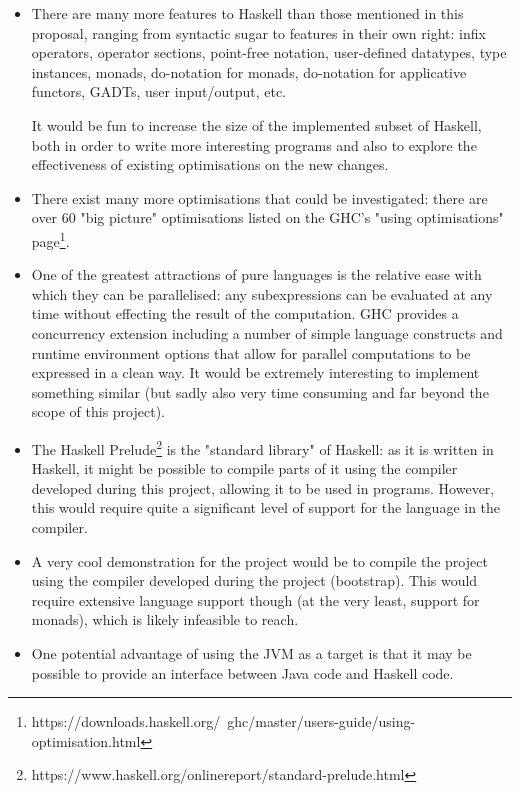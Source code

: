 \documentclass[12pt]{article}
\begin{document}
\begin{itemize}
\item
{
    There are many more features to Haskell than those mentioned in this proposal, ranging from syntactic sugar to
    features in their own right: infix operators, operator sections, point-free notation, user-defined datatypes, type
    instances, monads, do-notation for monads, do-notation for applicative functors, GADTs, user input/output, etc.

    It would be fun to increase the size of the implemented subset of Haskell, both in order to write more interesting
    programs and also to explore the effectiveness of existing optimisations on the new changes.
}
\item
{
    There exist many more optimisations that could be investigated: there are over 60 "big picture" optimisations listed
    on the GHC's "using optimisations"
    page\footnote{https://downloads.haskell.org/~ghc/master/users-guide/using-optimisation.html}.
}
\item
{
    One of the greatest attractions of pure languages is the relative ease with which they can be parallelised: any
    subexpressions can be evaluated at any time without effecting the result of the computation. GHC provides a
    concurrency extension including a number of simple language constructs and runtime environment options that allow
    for parallel computations to be expressed in a clean way. It would be extremely interesting to implement something
    similar (but sadly also very time consuming and far beyond the scope of this project).
}
\item
{
    The Haskell Prelude\footnote{https://www.haskell.org/onlinereport/standard-prelude.html} is the "standard library"
    of Haskell: as it is written in Haskell, it might be possible to compile parts of it using the compiler developed
    during this project, allowing it to be used in programs. However, this would require quite a significant level of
    support for the language in the compiler.
}
\item
{
    A very cool demonstration for the project would be to compile the project using the compiler developed during the
    project (bootstrap). This would require extensive language support though (at the very least, support for monads),
    which is likely infeasible to reach.
}
\item
{
    One potential advantage of using the JVM as a target is that it may be possible to provide an interface between Java
    code and Haskell code.
}
\end{itemize}
\end{document}
